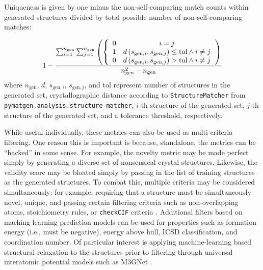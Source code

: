 Uniqueness is given by one minus the non-self-comparing match counts within generated structures divided by total possible number of non-self-comparing matches:

\begin{equation} \label{eq:uniqueness}
	1-\frac{\sum _{i=1}^{n_{\text{gen}}} \sum _{j=1}^{n_{\text{gen}}} \left(
		\left\{
		\begin{array}{cc}
			0 & i=j \\
			1 & d\left(s_{\text{gen},i},s_{\text{gen},j}\right)\leq \text{tol}\land i\neq j \\
			0 & d\left(s_{\text{gen},i},s_{\text{gen},j}\right)>\text{tol}\land i\neq j \\
		\end{array}
		\\
		\right.
		\right)}{n_{\text{gen}}^2-n_{\text{gen}}}
\end{equation}
where $n_{\text{gen}}$, $d$, $s_{\text{gen},i}$, $s_{\text{gen},j}$, and $\text{tol}$ represent number of structures in the generated set, crystallographic distance according to \texttt{StructureMatcher} from \texttt{pymatgen.analysis.structure\_matcher}, $i$-th structure of the generated set, $j$-th structure of the generated set, and a tolerance threshold, respectively.

While useful individually, these metrics can also be used as multi-criteria filtering. One reason this is important is because, standalone, the metrics can be ``hacked'' in some sense. For example, the novelty metric may be made perfect simply by generating a diverse set of nonsensical crystal structures. Likewise, the validity score may be bloated simply by passing in the list of training structures as the generated structures. To combat this, multiple criteria may be considered simultaneously: for example, requiring that a structure must be simultaneously novel, unique, and passing certain filtering criteria such as non-overlapping atoms, stoichiometry rules, or \texttt{checkCIF} criteria \cite{spekCheckCIFValidationALERTS2020}. Additional filters based on maching learning prediction models can be used for properties such as formation energy (i.e., must be negative), energy above hull, ICSD classification, and coordination number. Of particular interest is applying machine-learning based structural relaxation to the structures prior to filtering through universal interatomic potential models such as M3GNet \cite{chen_universal_2022}.
